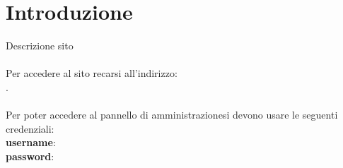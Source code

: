 \newpage
\section{Introduzione}
Descrizione sito 
~\\ ~\\
Per accedere al sito recarsi all'indirizzo:\\ \url{}.~\\ ~\\
Per poter accedere al pannello di amministrazionesi devono usare le seguenti credenziali:\\ 
\textbf{username}: \\ 
\textbf{password}: 